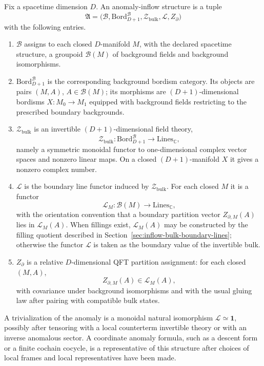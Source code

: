 \begin{definition}
\label{def:anomaly-inflow-datum}
Fix a spacetime dimension \(D\).  An anomaly-inflow structure is a tuple
\[
  \mathfrak A
  =
  \bigl(\mathcal B,\mathrm{Bord}_{D+1}^{\mathcal B},
  \mathcal Z_{\mathrm{bulk}},\mathcal L,Z_{\partial}\bigr)
\]
with the following entries.
\begin{enumerate}
\item \(\mathcal B\) assigns to each closed \(D\)-manifold \(M\), with the
declared spacetime structure, a groupoid \(\mathcal B(M)\) of background
fields and background isomorphisms.
\item \(\mathrm{Bord}_{D+1}^{\mathcal B}\) is the corresponding background
bordism category.  Its objects are pairs \((M,A)\), \(A\in\mathcal B(M)\);
its morphisms are \((D+1)\)-dimensional bordisms \(X:M_0\to M_1\) equipped
with background fields restricting to the prescribed boundary backgrounds.
\item \(\mathcal Z_{\mathrm{bulk}}\) is an invertible \((D+1)\)-dimensional
field theory,
\[
  \mathcal Z_{\mathrm{bulk}}:
  \mathrm{Bord}_{D+1}^{\mathcal B}\longrightarrow
  \mathrm{Lines}_{\mathbb C},
\]
namely a symmetric monoidal functor to one-dimensional complex vector spaces
and nonzero linear maps.  On a closed \((D+1)\)-manifold \(X\) it gives a
nonzero complex number.
\item \(\mathcal L\) is the boundary line functor induced by
\(\mathcal Z_{\mathrm{bulk}}\).  For each closed \(M\) it is a functor
\[
  \mathcal L_M:\mathcal B(M)\longrightarrow \mathrm{Lines}_{\mathbb C},
\]
with the orientation convention that a boundary partition vector
\(Z_{\partial,M}(A)\) lies in \(\mathcal L_M(A)\).  When fillings exist,
\(\mathcal L_M(A)\) may be constructed by the filling quotient described in
Section~\ref{sec:inflow-bulk-boundary-lines}; otherwise the functor
\(\mathcal L\) is taken as the boundary value of the invertible bulk.
\item \(Z_{\partial}\) is a relative \(D\)-dimensional QFT partition
assignment: for each closed \((M,A)\),
\[
  Z_{\partial,M}(A)\in \mathcal L_M(A),
\]
with covariance under background isomorphisms and with the usual gluing law
after pairing with compatible bulk states.
\end{enumerate}
A trivialization of the anomaly is a monoidal natural isomorphism
\(\mathcal L\simeq \mathbf 1\), possibly after tensoring with a local
counterterm invertible theory or with an inverse anomalous sector.  A
coordinate anomaly formula, such as a descent form or a finite cochain
cocycle, is a representative of this structure after choices of local frames
and local representatives have been made.
\end{definition}

